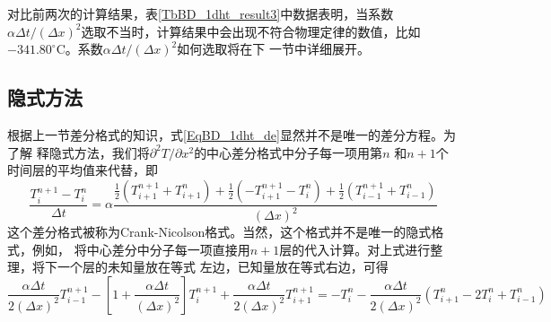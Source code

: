 对比前两次的计算结果，表\ref{TbBD_1dht_result3}中数据表明，当系数$\alpha\Delta t/(\Delta
x)^{2}$选取不当时，计算结果中会出现不符合物理定律的数值，比如
$-341.80^{\circ}\!\mathrm{C}$。系数$\alpha\Delta t/(\Delta x)^{2}$如何选取将在下
一节中详细展开。

\subsection{隐式方法}
根据上一节差分格式的知识，式\eqref{EqBD_1dht_de}显然并不是唯一的差分方程。为了解
释隐式方法，我们将$\partial^{2}T/\partial x^{2}$的中心差分格式中分子每一项用第$n$
和$n+1$个时间层的平均值来代替，即
\begin{equation}
  \frac{T_{i}^{n+1}-T_{i}^{n}}{\Delta t}
  =
  \alpha
  \frac{
    \frac{1}{2}(T_{i+1}^{n+1}+T_{i+1}^{n}) +
    \frac{1}{2}(-T_{i+1}^{n+1}-T_{i}^{n}) +
    \frac{1}{2}(T_{i-1}^{n+1}+T_{i-1}^{n}) 
  }{(\Delta x)^{2}}
\end{equation}
这个差分格式被称为Crank-Nicolson格式。当然，这个格式并不是唯一的隐式格式，例如，
将中心差分中分子每一项直接用$n+1$层的代入计算。对上式进行整理，将下一个层的未知量放在等式
左边，已知量放在等式右边，可得
\begin{equation}
  \frac{\alpha\Delta t}{2(\Delta x)^{2}}
  T_{i-1}^{n+1} 
  -
  \left[1+\frac{\alpha\Delta t}{(\Delta x)^{2}}\right]
  T_{i}^{n+1} 
  +
  \frac{\alpha\Delta t}{2(\Delta x)^{2}}
  T_{i+1}^{n+1} 
  =
  -T_{i}^{n}
  -
  \frac{\alpha\Delta t}{2(\Delta x)^{2}}
  (T_{i+1}^{n} - 2T_{i}^{n} + T_{i-1}^{n})
  \label{EqBD_1dht_cr_2}
\end{equation}

